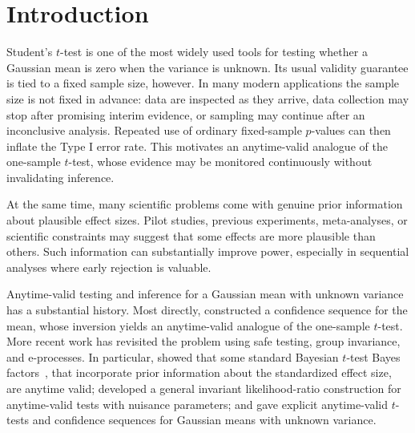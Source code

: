 \section{Introduction}
\label{sec:introduction}

Student's \(t\)-test is one of the most widely used tools for testing
whether a Gaussian mean is zero when the variance is unknown. Its usual validity guarantee is tied to a fixed sample size, however. In many modern
applications the sample size is not fixed in advance: data are inspected
as they arrive, data collection may stop after promising interim
evidence, or sampling may continue after an inconclusive analysis.
Repeated use of ordinary fixed-sample \(p\)-values can then inflate the
Type I error rate. This motivates an anytime-valid analogue of the
one-sample \(t\)-test, whose evidence may be monitored continuously
without invalidating inference.%

At the same time, many scientific problems come with genuine prior
information about plausible effect sizes. Pilot studies, previous
experiments, meta-analyses, or scientific constraints may suggest that
some effects are more plausible than others. Such information can
substantially improve power, especially in sequential analyses where
early rejection is valuable. 

Anytime-valid testing and inference for a Gaussian mean with unknown variance has a
substantial history. Most directly, \citet{Lai1976} constructed a
confidence sequence for the mean, whose inversion yields an
anytime-valid analogue of the one-sample \(t\)-test. More recent work has
revisited the problem using safe testing, group invariance, and
e-processes. In particular, \citet{Grunwald2024} showed that some standard Bayesian
\(t\)-test Bayes factors~\citep{Jeffreys1961,Zellner1980,Rouder2009,Gronau2020}, that incorporate prior
information about the standardized effect size, are anytime valid;
\citet{PerezOrtiz2024} developed a general invariant likelihood-ratio
construction for anytime-valid tests with nuisance parameters; and
\citet{Wang2025} gave explicit anytime-valid \(t\)-tests and confidence
sequences for Gaussian means with unknown variance. 



